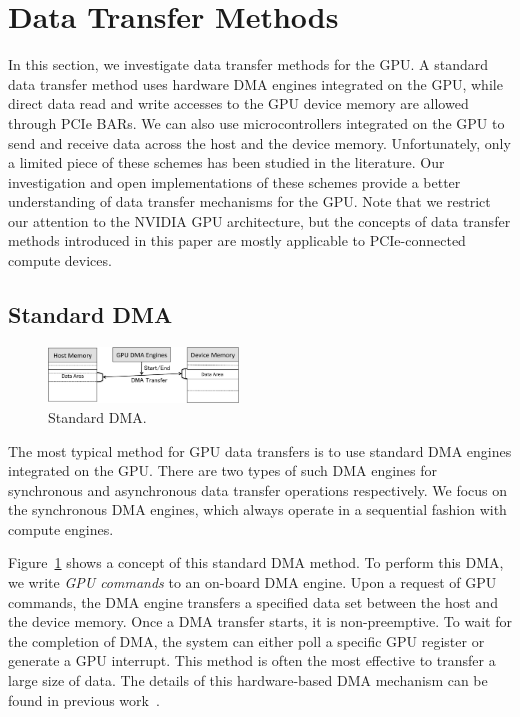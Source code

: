 \section{Data Transfer Methods}
\label{sec:data_transfer_methods}

In this section, we investigate data transfer methods for the GPU.
A standard data transfer method uses hardware DMA engines integrated on
the GPU, while direct data read and write accesses to the GPU device
memory are allowed through PCIe BARs.
We can also use microcontrollers integrated on the GPU to send and
receive data across the host and the device memory.
Unfortunately, only a limited piece of these schemes has been studied in
the literature.
Our investigation and open implementations of these schemes provide a
better understanding of data transfer mechanisms for the GPU.
Note that we restrict our attention to the NVIDIA GPU architecture, but
the concepts of data transfer methods introduced in this paper are
mostly applicable to PCIe-connected compute devices.

\subsection{Standard DMA}
\label{sec:dma}

\begin{figure}[!t]
 \centering
 \includegraphics[width=0.45\textwidth]{figure/Method/DMA_Method.pdf}
 \caption{Standard DMA.}
 \label{fig:dma}
\end{figure}

The most typical method for GPU data transfers is to use standard DMA
engines integrated on the GPU.
There are two types of such DMA engines for synchronous and asynchronous
data transfer operations respectively.
We focus on the synchronous DMA engines, which always operate in a
sequential fashion with compute engines.

Figure~\ref{fig:dma} shows a concept of this standard DMA method.
To perform this DMA, we write \textit{GPU commands} to an on-board DMA
engine.
Upon a request of GPU commands, the DMA engine transfers a specified
data set between the host and the device memory.
Once a DMA transfer starts, it is non-preemptive.
To wait for the completion of DMA, the system can either poll a specific
GPU register or generate a GPU interrupt.
This method is often the most effective to transfer a large size of
data.
The details of this hardware-based DMA mechanism can be found in
previous work~\cite{Kato_ATC11, Kato_ATC12}.

